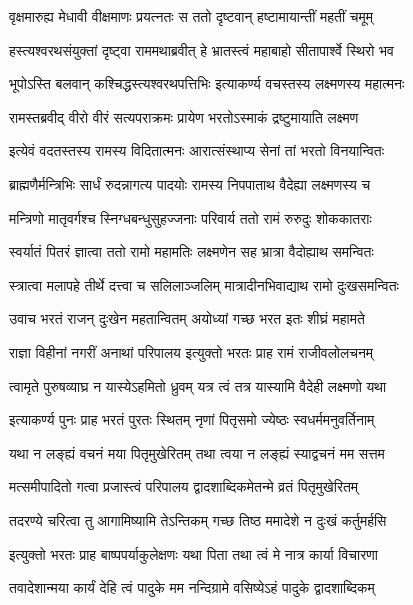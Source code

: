 \twolineshloka
{वृक्षमारुह्य मेधावी वीक्षमाणः प्रयत्नतः}
{स ततो दृष्टवान् हष्टामायान्तीं महतीं चमूम्} %

\twolineshloka
{हस्त्यश्वरथसंयुक्तां दृष्ट्वा राममथाब्रवीत्}
{हे भ्रातस्त्वं महाबाहो सीतापार्श्वे स्थिरो भव} %

\twolineshloka
{भूपोऽस्ति बलवान् कश्चिद्धस्त्यश्वरथपत्तिभिः}
{इत्याकर्ण्य वचस्तस्य लक्ष्मणस्य महात्मनः} %

\twolineshloka
{रामस्तब्रवीद् वीरो वीरं सत्यपराक्रमः}
{प्रायेण भरतोऽस्माकं द्रष्टुमायाति लक्ष्मण} %

\twolineshloka
{इत्येवं वदतस्तस्य रामस्य विदितात्मनः}
{आरात्संस्थाप्य सेनां तां भरतो विनयान्वितः} %

\twolineshloka
{ब्राह्मणैर्मन्त्रिभिः सार्धं रुदन्नागत्य पादयोः}
{रामस्य निपपाताथ वैदेह्या लक्ष्मणस्य च} %

\twolineshloka
{मन्त्रिणो मातृवर्गश्च स्निग्धबन्धुसुहज्जनाः}
{परिवार्य ततो रामं रुरुदुः शोककातराः} %

\twolineshloka
{स्वर्यातं पितरं ज्ञात्वा ततो रामो महामतिः}
{लक्ष्मणेन सह भ्रात्रा वैदोह्याथ समन्वितः} %

\twolineshloka
{स्त्रात्वा मलापहे तीर्थे दत्त्वा च सलिलाञ्जलिम्}
{मात्रादीनभिवाद्याथ रामो दुःखसमन्वितः} %

\twolineshloka
{उवाच भरतं राजन् दुःखेन महतान्वितम्}
{अयोध्यां गच्छ भरत इतः शीघ्रं महामते} %

\twolineshloka
{राज्ञा विहीनां नगरीं अनाथां परिपालय}
{इत्युक्तो भरतः प्राह रामं राजीवलोलचनम्} %

\twolineshloka
{त्वामृते पुरुषव्याघ्र न यास्येऽहमितो ध्रुवम्}
{यत्र त्वं तत्र यास्यामि वैदेही लक्ष्मणो यथा} %

\twolineshloka
{इत्याकर्ण्य पुनः प्राह भरतं पुरतः स्थितम्}
{नृणां पितृसमो ज्येष्ठः स्वधर्ममनुवर्तिनाम्} %

\twolineshloka
{यथा न लङ्ह्यं वचनं मया पितृमुखेरितम्}
{तथा त्वया न लङ्ह्यं स्याद्वचनं मम सत्तम} %

\twolineshloka
{मत्समीपादितो गत्वा प्रजास्त्वं परिपालय}
{द्वादशाब्दिकमेतन्मे व्रतं पितृमुखेरितम्} %

\twolineshloka
{तदरण्ये चरित्वा तु आगामिष्यामि तेऽन्तिकम्}
{गच्छ तिष्ठ ममादेशे न दुःखं कर्तुमर्हसि} %

\twolineshloka
{इत्युक्तो भरतः प्राह बाष्पपर्याकुलेक्षणः}
{यथा पिता तथा त्वं मे नात्र कार्या विचारणा} %

\twolineshloka
{तवादेशान्मया कार्यं देहि त्वं पादुके मम}
{नन्दिग्रामे वसिष्येऽहं पादुके द्वादशाब्दिकम्} %

